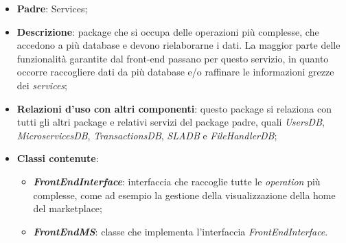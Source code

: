 \begin{itemize}
	\item \textbf{Padre}: Services;
	
	\item \textbf{Descrizione}: package che si occupa delle operazioni più complesse, che accedono a più database e devono rielaborarne i dati. La maggior parte delle funzionalità garantite dal front-end passano per questo servizio, in quanto occorre raccogliere dati da più database e/o raffinare le informazioni grezze dei \textit{services};
	
	\item \textbf{Relazioni d'uso con altri componenti}: questo package si relaziona con tutti gli altri package e relativi servizi del package padre, quali \textit{UsersDB}, \textit{MicroservicesDB}, \textit{TransactionsDB}, \textit{SLADB} e \textit{FileHandlerDB};
	
	\item \textbf{Classi contenute}:
	\begin{itemize}
		\item \textbf{\textit{FrontEndInterface}}: interfaccia che raccoglie tutte le \textit{operation} più complesse, come ad esempio la gestione della visualizzazione della home del marketplace;
		
		\item \textbf{\textit{FrontEndMS}}: classe che implementa l'interfaccia \textit{FrontEndInterface}.
	\end{itemize}
\end{itemize}
